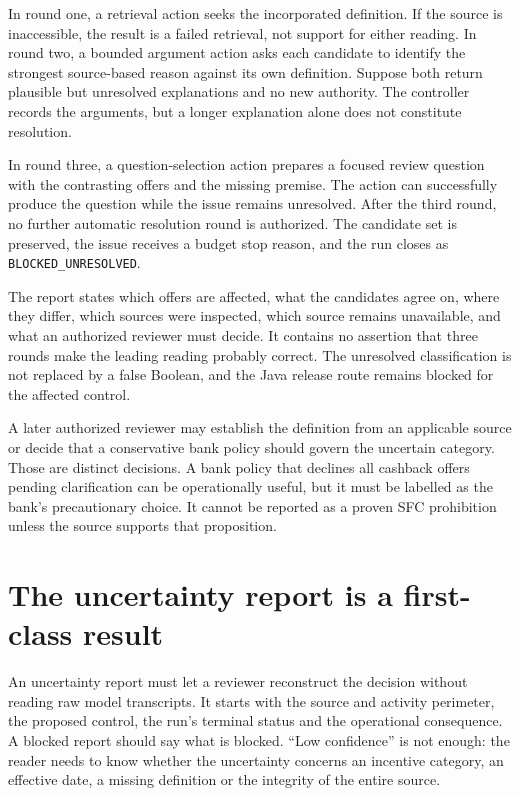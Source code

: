 \documentclass[12pt,a4paper,oneside,openany]{book}
\begin{document}
In round one, a retrieval action seeks the incorporated definition. If the source
is inaccessible, the result is a failed retrieval, not support for either
reading. In round two, a bounded argument action asks each candidate to identify
the strongest source-based reason against its own definition. Suppose both
return plausible but unresolved explanations and no new authority. The controller
records the arguments, but a longer explanation alone does not constitute
resolution.

In round three, a question-selection action prepares a focused review question
with the contrasting offers and the missing premise. The action can successfully
produce the question while the issue remains unresolved. After the third round,
no further automatic resolution round is authorized. The candidate set is
preserved, the issue receives a budget stop reason, and the run closes as
\texttt{BLOCKED\_UNRESOLVED}.

The report states which offers are affected, what the candidates agree on, where
they differ, which sources were inspected, which source remains unavailable, and
what an authorized reviewer must decide. It contains no assertion that three
rounds make the leading reading probably correct. The unresolved classification
is not replaced by a false Boolean, and the Java release route remains blocked
for the affected control.

A later authorized reviewer may establish the definition from an applicable
source or decide that a conservative bank policy should govern the uncertain
category. Those are distinct decisions. A bank policy that declines all cashback
offers pending clarification can be operationally useful, but it must be labelled
as the bank's precautionary choice. It cannot be reported as a proven SFC
prohibition unless the source supports that proposition.

\section{The uncertainty report is a first-class result}

An uncertainty report must let a reviewer reconstruct the decision without
reading raw model transcripts. It starts with the source and activity perimeter,
the proposed control, the run's terminal status and the operational consequence.
A blocked report should say what is blocked. ``Low confidence'' is not enough:
the reader needs to know whether the uncertainty concerns an incentive category,
an effective date, a missing definition or the integrity of the entire source.
\end{document}
